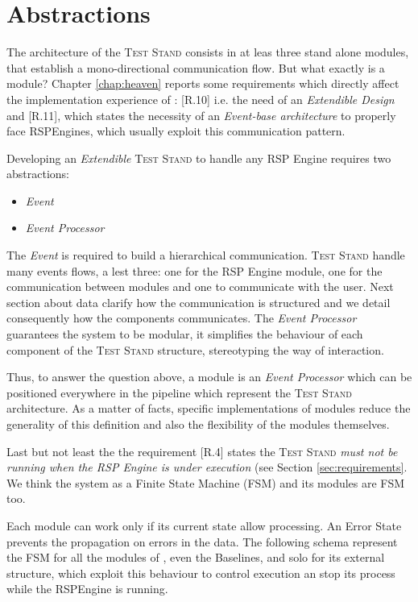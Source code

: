 
\section{Abstractions}

The architecture of the \textsc{Test Stand} consists in at leas three stand alone modules, that establish a mono-directional communication flow. But what exactly is a module? Chapter \ref{chap:heaven} reports some requirements which directly affect the implementation experience of \namens : [R.10] i.e. the need of an \textit{Extendible Design} and [R.11], which states the necessity of an \textit{Event-base architecture} to properly face RSPEngines,  which usually exploit this communication pattern.

Developing an \textit{Extendible} \textsc{Test Stand} to handle any RSP Engine requires two abstractions:
\begin{itemize}
\item \textit{Event}
\item \textit{Event Processor}
\end{itemize} 

The \textit{Event} is required to build a hierarchical communication. \textsc{Test Stand} handle many events flows, a lest three: one for the RSP Engine module, one for the communication between modules and one to communicate with the user. Next section about data clarify how the communication is structured and we detail consequently how the components communicates. The \textit{Event Processor} guarantees the system to be modular, it simplifies the behaviour of each component of the \textsc{Test Stand} structure, stereotyping the way of interaction. 

Thus, to answer the question above, a module is an \textit{Event Processor} which can be positioned everywhere in the pipeline which represent the \textsc{Test Stand} architecture. 
As a matter of facts, specific implementations of modules reduce the generality of this definition and also the flexibility of the modules themselves.	

Last but not least the the requirement [R.4] states the \textsc{Test Stand}\textit{ must not be running when the RSP Engine is under execution} (see Section \ref{sec:requirements}. We think the system as a Finite State Machine (FSM) and its modules are FSM too.

Each module can work only if its current state allow processing. An Error State prevents the propagation on errors in the data. The following schema represent the FSM for all the modules of \name, even the Baselines, and solo for its external structure, which exploit this behaviour to control execution an stop its process while the RSPEngine is running.

